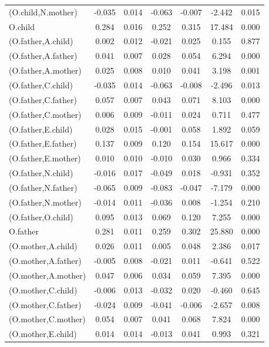 \documentclass[11pt,a5paper,twoside]{book}
\begin{document}
{{\begin{center}
\begin{longtable}{@{\extracolsep{\fill}}lcccccc@{}}
   (O.child,N.mother)  & -0.035 & 0.014 & -0.063 & -0.007 & -2.442 & 0.015 \\ 
   O.child  & 0.284 & 0.016 & 0.252 & 0.315 & 17.484 & 0.000 \\ 
   (O.father,A.child)  & 0.002 & 0.012 & -0.021 & 0.025 & 0.155 & 0.877 \\ 
   (O.father,A.father)  & 0.041 & 0.007 & 0.028 & 0.054 & 6.294 & 0.000 \\ 
   (O.father,A.mother)  & 0.025 & 0.008 & 0.010 & 0.041 & 3.198 & 0.001 \\ 
   (O.father,C.child)  & -0.035 & 0.014 & -0.063 & -0.008 & -2.496 & 0.013 \\ 
   (O.father,C.father)  & 0.057 & 0.007 & 0.043 & 0.071 & 8.103 & 0.000 \\ 
   (O.father,C.mother)  & 0.006 & 0.009 & -0.011 & 0.024 & 0.711 & 0.477 \\ 
   (O.father,E.child)  & 0.028 & 0.015 & -0.001 & 0.058 & 1.892 & 0.059 \\ 
   (O.father,E.father)  & 0.137 & 0.009 & 0.120 & 0.154 & 15.617 & 0.000 \\ 
   (O.father,E.mother)  & 0.010 & 0.010 & -0.010 & 0.030 & 0.966 & 0.334 \\ 
   (O.father,N.child)  & -0.016 & 0.017 & -0.049 & 0.018 & -0.931 & 0.352 \\ 
   (O.father,N.father)  & -0.065 & 0.009 & -0.083 & -0.047 & -7.179 & 0.000 \\ 
   (O.father,N.mother)  & -0.014 & 0.011 & -0.036 & 0.008 & -1.254 & 0.210 \\ 
   (O.father,O.child)  & 0.095 & 0.013 & 0.069 & 0.120 & 7.255 & 0.000 \\ 
   O.father  & 0.281 & 0.011 & 0.259 & 0.302 & 25.880 & 0.000 \\ 
   (O.mother,A.child)  & 0.026 & 0.011 & 0.005 & 0.048 & 2.386 & 0.017 \\ 
   (O.mother,A.father)  & -0.005 & 0.008 & -0.021 & 0.011 & -0.641 & 0.522 \\ 
   (O.mother,A.mother)  & 0.047 & 0.006 & 0.034 & 0.059 & 7.395 & 0.000 \\ 
   (O.mother,C.child)  & -0.006 & 0.013 & -0.032 & 0.020 & -0.460 & 0.645 \\ 
   (O.mother,C.father)  & -0.024 & 0.009 & -0.041 & -0.006 & -2.657 & 0.008 \\ 
   (O.mother,C.mother)  & 0.054 & 0.007 & 0.041 & 0.068 & 7.824 & 0.000 \\ 
   (O.mother,E.child)  & 0.014 & 0.014 & -0.013 & 0.041 & 0.993 & 0.321 \\ 

\end{longtable}
\end{center}}}
\end{document}
